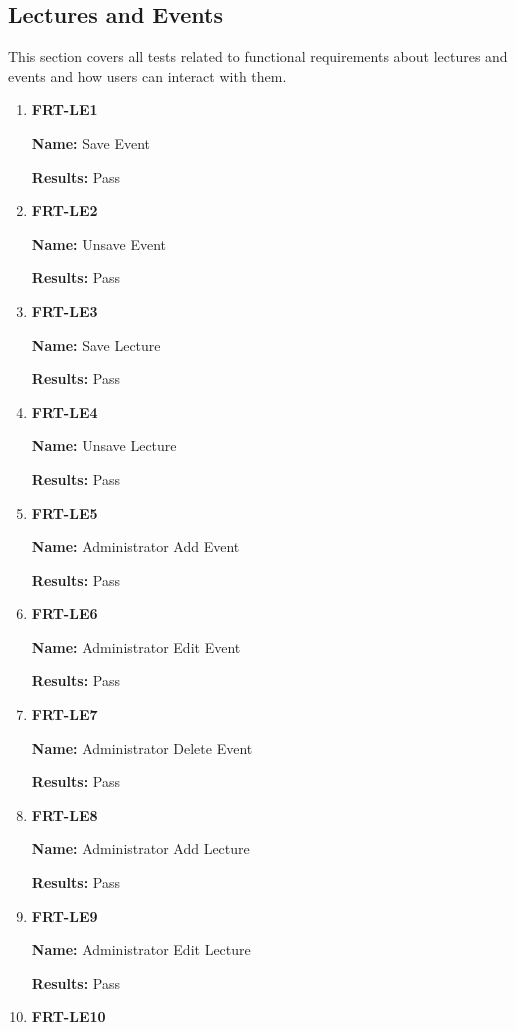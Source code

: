 \documentclass[12pt, titlepage]{article}
\begin{document}
\subsection{Lectures and Events}
This section covers all tests related to functional requirements about lectures and events and how users can interact with them.
\begin{enumerate}
\item \textbf{FRT-LE1}

\textbf{Name:} Save Event

\textbf{Results:} Pass

\item \textbf{FRT-LE2}

\textbf{Name:} Unsave Event

\textbf{Results:} Pass

\item \textbf{FRT-LE3}

\textbf{Name:} Save Lecture

\textbf{Results:} Pass

\item \textbf{FRT-LE4}

\textbf{Name:} Unsave Lecture

\textbf{Results:} Pass

\item \textbf{FRT-LE5}

\textbf{Name:} Administrator Add Event

\textbf{Results:} Pass

\item \textbf{FRT-LE6}

\textbf{Name:} Administrator Edit Event

\textbf{Results:} Pass

\item \textbf{FRT-LE7}

\textbf{Name:} Administrator Delete Event

\textbf{Results:} Pass

\item \textbf{FRT-LE8}

\textbf{Name:} Administrator Add Lecture

\textbf{Results:} Pass

\item \textbf{FRT-LE9}

\textbf{Name:} Administrator Edit Lecture

\textbf{Results:} Pass

\item \textbf{FRT-LE10}


\end{enumerate}
\end{document}
